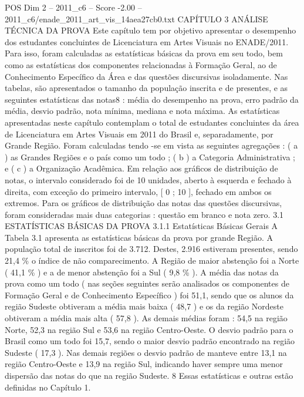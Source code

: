 \begin{textsample}{POS Dim 2 – 2011\_c6 – Score -2.00 – 2011\_c6/enade\_2011\_art\_vis\_14aea27cb0.txt}  \label{ex:f2_pos_410}
CAPÍTULO 3 ANÁLISE TÉCNICA DA PROVA Este capítulo tem por objetivo apresentar o desempenho dos estudantes concluintes de Licenciatura em Artes Visuais no ENADE/2011.
Para isso, foram calculadas as estatísticas básicas da prova em seu todo, bem como as estatísticas dos componentes relacionadas à Formação Geral, ao de Conhecimento Específico da Área e das questões discursivas isoladamente.
Nas tabelas, são apresentados o tamanho da população inscrita e de presentes, e as seguintes estatísticas das notas8 : média do desempenho na prova, erro padrão da média, desvio padrão, nota mínima, mediana e nota máxima.
As estatísticas apresentadas neste capítulo contemplam o total de estudantes concluintes da área de Licenciatura em Artes Visuais em 2011 do Brasil e, separadamente, por Grande Região.
Foram calculadas tendo -se em vista as seguintes agregações : ( a ) as Grandes Regiões e o país como um todo ; ( b ) a Categoria Administrativa ; e ( c ) a Organização Acadêmica.
Em relação aos gráficos de distribuição de notas, o intervalo considerado foi de 10 unidades, aberto à esquerda e fechado à direita, com exceção do primeiro intervalo, [ 0 ; 10 ], fechado em ambos os extremos.
Para os gráficos de distribuição das notas das questões discursivas, foram consideradas mais duas categorias : questão em branco e nota zero. 3.1 ESTATÍSTICAS BÁSICAS DA PROVA 3.1.1 Estatísticas Básicas Gerais A Tabela 3.1 apresenta as estatísticas básicas da prova por grande Região.
A população total de inscritos foi de 3.712.
Destes, 2.916 estiveram presentes, sendo 21,4 \% o índice de não comparecimento.
A Região de maior abstenção foi a Norte ( 41,1 \% ) e a de menor abstenção foi a Sul ( 9,8 \% ).
A média das notas da prova como um todo ( nas seções seguintes serão analisados os componentes de Formação Geral e de Conhecimento Específico ) foi 51,1, sendo que os alunos da região Sudeste obtiveram a média mais baixa ( 48,7 ) e os da região Nordeste obtiveram a média mais alta ( 57,8 ).
As demais médias foram : 54,5 na região Norte, 52,3 na região Sul e 53,6 na região Centro-Oeste.
O desvio padrão para o Brasil como um todo foi 15,7, sendo o maior desvio padrão encontrado na região Sudeste ( 17,3 ).
Nas demais regiões o desvio padrão de manteve entre 13,1 na região Centro-Oeste e 13,9 na região Sul, indicando haver sempre uma menor dispersão das notas do que na região Sudeste. 8 Essas estatísticas e outras estão definidas no Capítulo 1.

\end{textsample}
